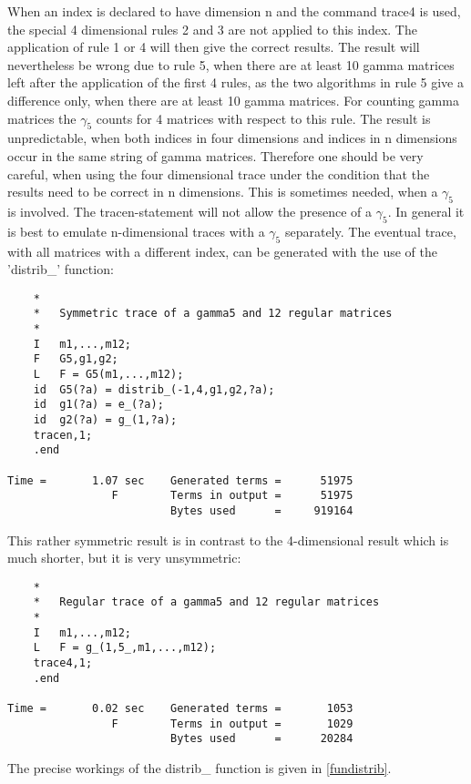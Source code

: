 When an index is declared to have dimension n and the command trace4 is 
used, the special 4 dimensional rules 2 and 3 are not applied to this 
index. The application of rule 1 or 4 will then give the correct 
results. The result will nevertheless be wrong due to rule 5, when there 
are at least 10 gamma matrices left after the application of the first 4 
rules, as the two algorithms in rule 5 give a difference only, when 
there are at least 10 gamma matrices. For counting gamma matrices the 
$\gamma_5$ counts for 4 matrices with respect to this rule. The result 
is unpredictable, when both indices in four dimensions and indices in n 
dimensions occur in the same string of gamma matrices. Therefore one 
should be very careful, when using the four dimensional trace under the 
condition that the results need to be correct in n dimensions. This is 
sometimes needed, when a $\gamma_5$ is involved. The tracen-statement 
will not allow the presence of a $\gamma_5$. In general it is best to 
emulate n-dimensional traces with a $\gamma_5$ separately. The eventual 
trace, with all matrices with a different index, can be generated with 
the use of the 'distrib\_' function:
\begin{verbatim}
    *
    *   Symmetric trace of a gamma5 and 12 regular matrices
    *
    I   m1,...,m12;
    F   G5,g1,g2;
    L   F = G5(m1,...,m12);
    id  G5(?a) = distrib_(-1,4,g1,g2,?a);
    id  g1(?a) = e_(?a);
    id  g2(?a) = g_(1,?a);
    tracen,1;
    .end

Time =       1.07 sec    Generated terms =      51975
                F        Terms in output =      51975
                         Bytes used      =     919164
\end{verbatim}
This rather symmetric result is in contrast to the 4-dimensional result 
which is much shorter, but it is very unsymmetric:
\begin{verbatim}
    *
    *   Regular trace of a gamma5 and 12 regular matrices
    *
    I   m1,...,m12;
    L   F = g_(1,5_,m1,...,m12);
    trace4,1;
    .end

Time =       0.02 sec    Generated terms =       1053
                F        Terms in output =       1029
                         Bytes used      =      20284
\end{verbatim}
The precise workings of the distrib\_ function is given in 
\ref{fundistrib}.

